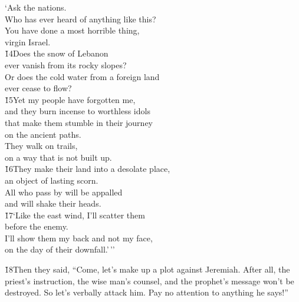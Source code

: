 \begin{poetry}
\poeml `Ask the nations. \\
\poemll    Who has ever heard of anything like this? \\
\poeml You have done a most horrible thing, \\
\poemll    virgin Israel. \\
\poeml \v{14}Does the snow of Lebanon \\
\poemll    ever vanish from its rocky slopes? \\
\poeml Or does the cold water from a foreign land \\
\poemll    ever cease to flow? \\
\poeml \v{15}Yet my people have forgotten me, \\
\poemll    and they burn incense to worthless idols \\
\poeml that make them stumble in their journey \\
\poemll    on the ancient paths. \\
\poeml They walk on trails, \\
\poemll    on a way that is not built up. \\
\poeml \v{16}They make their land into a desolate place, \\
\poemll    an object of lasting scorn. \\
\poeml All who pass by will be appalled \\
\poemll    and will shake their heads. \\
\poeml \v{17}`Like the east wind, I'll scatter them \\
\poemll    before the enemy. \\
\poeml I'll show them my back and not my face, \\
\poemll    on the day of their downfall.'\,''
\end{poetry}

\v{18}Then they said, ``Come, let's make up a plot against Jeremiah. After all, the priest's instruction, the wise man's counsel, and the prophet's message won't be destroyed. So let's verbally attack him. Pay no attention to anything he says!''

